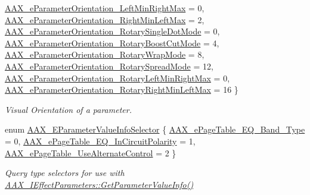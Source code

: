 \begin{DoxyCompactItemize}
\mbox{\hyperlink{a00491_aa5ffa1ed828630b6b7a13c049d93ae87a4e074c855fdeb439e2623d920173e752}{A\+A\+X\+\_\+e\+Parameter\+Orientation\+\_\+\+Left\+Min\+Right\+Max}} = 0, 
\newline
\mbox{\hyperlink{a00491_aa5ffa1ed828630b6b7a13c049d93ae87a0af7cb043bffaab1db4e96ccd06d6b45}{A\+A\+X\+\_\+e\+Parameter\+Orientation\+\_\+\+Right\+Min\+Left\+Max}} = 2, 
\mbox{\hyperlink{a00491_aa5ffa1ed828630b6b7a13c049d93ae87afa515dbe70fe88c026dd90328ec67992}{A\+A\+X\+\_\+e\+Parameter\+Orientation\+\_\+\+Rotary\+Single\+Dot\+Mode}} = 0, 
\mbox{\hyperlink{a00491_aa5ffa1ed828630b6b7a13c049d93ae87a87dddbd14fdcbd616a7f2502f6beed73}{A\+A\+X\+\_\+e\+Parameter\+Orientation\+\_\+\+Rotary\+Boost\+Cut\+Mode}} = 4, 
\mbox{\hyperlink{a00491_aa5ffa1ed828630b6b7a13c049d93ae87ab42ad685ac842d36bc7d1717c537c10a}{A\+A\+X\+\_\+e\+Parameter\+Orientation\+\_\+\+Rotary\+Wrap\+Mode}} = 8, 
\newline
\mbox{\hyperlink{a00491_aa5ffa1ed828630b6b7a13c049d93ae87aa977173bc8874b34228fbf2ca04f9d69}{A\+A\+X\+\_\+e\+Parameter\+Orientation\+\_\+\+Rotary\+Spread\+Mode}} = 12, 
\mbox{\hyperlink{a00491_aa5ffa1ed828630b6b7a13c049d93ae87a9f441bb5192bd7b7162ba588c8f4fea8}{A\+A\+X\+\_\+e\+Parameter\+Orientation\+\_\+\+Rotary\+Left\+Min\+Right\+Max}} = 0, 
\mbox{\hyperlink{a00491_aa5ffa1ed828630b6b7a13c049d93ae87acce02fc86d8eeafa3659ed0ee9f30186}{A\+A\+X\+\_\+e\+Parameter\+Orientation\+\_\+\+Rotary\+Right\+Min\+Left\+Max}} = 16
 \}
\begin{DoxyCompactList}\small\item\em Visual Orientation of a parameter. \end{DoxyCompactList}\item 
enum \mbox{\hyperlink{a00491_aa169208a2ce713fa021e20deb2eaf608}{A\+A\+X\+\_\+\+E\+Parameter\+Value\+Info\+Selector}} \{ \mbox{\hyperlink{a00491_aa169208a2ce713fa021e20deb2eaf608a99ca84cc3dae0f125082d36893a12bcd}{A\+A\+X\+\_\+e\+Page\+Table\+\_\+\+E\+Q\+\_\+\+Band\+\_\+\+Type}} = 0, 
\mbox{\hyperlink{a00491_aa169208a2ce713fa021e20deb2eaf608ac5a06a293b7706191d3371813c47e999}{A\+A\+X\+\_\+e\+Page\+Table\+\_\+\+E\+Q\+\_\+\+In\+Circuit\+Polarity}} = 1, 
\mbox{\hyperlink{a00491_aa169208a2ce713fa021e20deb2eaf608a1a0d975a333d3aee81b22f878697e9c4}{A\+A\+X\+\_\+e\+Page\+Table\+\_\+\+Use\+Alternate\+Control}} = 2
 \}
\begin{DoxyCompactList}\small\item\em Query type selectors for use with \mbox{\hyperlink{a01669_a1702de6d62b5b41b6a8b2f510300392b}{A\+A\+X\+\_\+\+I\+Effect\+Parameters\+::\+Get\+Parameter\+Value\+Info()}} \end{DoxyCompactList}\item 

\end{DoxyCompactItemize}

